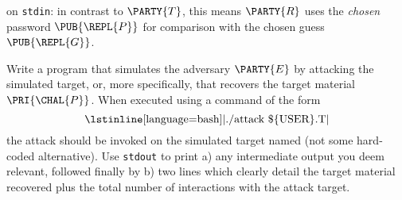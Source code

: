 \noindent
on \lstinline[language={bash}]{stdin}:
in contrast to $\PARTY{T}$, this means $\PARTY{R}$ uses the
{\em chosen} password $\PUB{\REPL{P}}$
for comparison with the
     chosen  guess    $\PUB{\REPL{G}}$.



      Write a program that simulates the adversary $\PARTY{E}$ by attacking
      the simulated target, or, more specifically, that recovers the target 
      material $\PRI{\CHAL{P}}$.  
      When executed using a command of the form
      \[
      \mbox{\lstinline[language={bash}]|./attack \$\{USER\}.T|}
      \]
      the attack should be invoked on the simulated target named (not some
      hard-coded alternative).  Use \lstinline[language={bash}]{stdout} to 
      print 
      a) any intermediate output you deem relevant, followed finally by 
      b) two lines which clearly detail the target material recovered plus
         the total number of interactions with the attack target.

